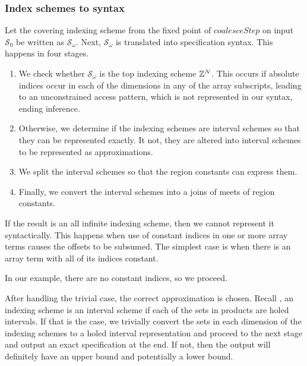 \subsubsection{Index schemes to syntax}

\newcommand{\finalSet}{\mathcal{S}_\omega}
Let the covering indexing scheme from the fixed point of
$\mathit{coalesceStep}$ on input $\mathcal{S}_0$ be written as
$\finalSet{}$.  Next, $\finalSet{}$ is translated into specification
syntax. This happens in four stages.

\begin{enumerate}[leftmargin=1.5em]
  \item We check whether $\finalSet{}$
  is the top indexing scheme $\textnormal{$\mathbb{Z}$}{}^N$. This occurs if absolute indices
  occur in each of the dimensions in any of the array subscripts,
  leading to an unconstrained access pattern, which is not represented
  in our syntax, ending inference.

  \item Otherwise, we determine if the indexing schemes are interval
  schemes so that they can be represented exactly. It not, they are
  altered into interval schemes to be represented as approximations.

  \item We split the interval schemes so that the region constants can
  express them.

  \item Finally, we convert the interval schemes into a joins of meets
  of region constants.
\end{enumerate}

If the result is an all infinite indexing scheme, then we cannot represent it
syntactically. This happens when use of constant indices in one or more array
terms causes the offsets to be subsumed. The simplest case is when there is an
array term with all of its indices constant.

In our example, there are no constant indices, so we proceed.

After handling the trivial case, the correct approximation is chosen. Recall
, an indexing scheme is an interval scheme if each of
the sets in products are holed intervals. If that is the case, we trivially
convert the sets in each dimension of the indexing schemes to a holed interval
representation and proceed to the next stage and output an exact specification
at the end. If not, then the output will definitely have an upper bound and
potentially a lower bound.

